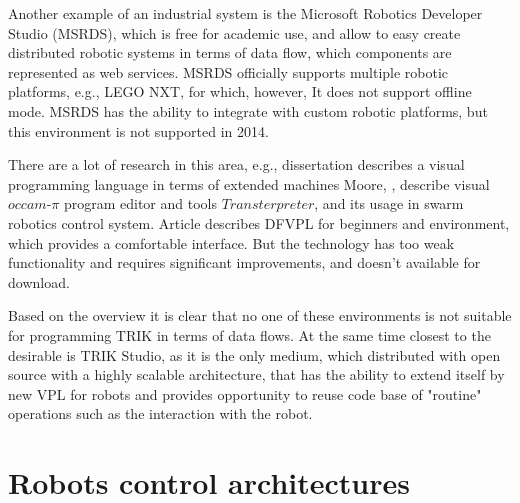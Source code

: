 \documentclass[conference,compsoc]{IEEEtran}
\begin{document}
Another example of an industrial system is the Microsoft Robotics Developer Studio (MSRDS)\cite{jackson2007microsoft}, which is free for academic use, and allow to easy create distributed robotic systems in terms of data flow, which components are represented as web services. MSRDS officially supports multiple robotic platforms, e.g., LEGO NXT\cite{kim2007programming}, for which, however, It does not support offline mode. MSRDS has the ability to integrate with  custom robotic platforms, but this environment is not supported in 2014.
 
There are a lot of research in this area, e.g., dissertation\cite{banyasad2000visual} describes a visual programming language in terms of extended machines Moore, \cite{simpson2008visual},\cite{posso2011process} describe visual $occam\mbox{-}\pi$ program editor and tools $Transterpreter$, and its usage in  swarm robotics control system. Article\cite{diprose2011ruru} describes DFVPL for beginners and environment, which provides a comfortable interface. But the technology has too weak functionality and requires significant improvements, and doesn't available for download.

Based on the overview it is clear that no one of these environments is not suitable for programming TRIK in terms of data flows. At the same time closest to the desirable is TRIK Studio, as it is the only medium, which distributed with open source with a highly scalable architecture, that has the ability to extend itself by new VPL for robots and provides opportunity to reuse code base of "routine" operations such as the interaction with the robot.


\section{Robots control architectures}
\label{sec:architecture}
\end{document}
